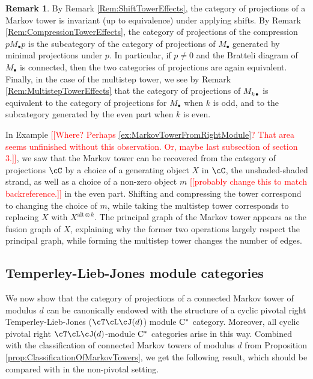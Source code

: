 \documentclass[11pt]{article}
\theoremstyle{plain}
\theoremstyle{definition}
\newtheorem{rem}[thm]{Remark}
\newcommand{\Cstar}{\rm{C^*}}
\newcommand{\nn}[1]{\textcolor{red}{[[#1]]}}
\begin{document}
\begin{rem}
By Remark \ref{Rem:ShiftTowerEffects}, the category of projections of a Markov tower is invariant (up to equivalence) under applying shifts. By Remark \ref{Rem:CompressionTowerEffects}, the category of projections of the compression $pM_\bullet p$ is the subcategory of the category of projections of $M_\bullet$ generated by minimal projections under $p$. In particular, if $p\neq 0$ and the Bratteli diagram of $M_\bullet$ is connected, then the two categories of projections are again equivalent. Finally, in the case of the multistep tower, we see by Remark \ref{Rem:MultistepTowerEffects} that the category of projections of $M_{k\bullet}$ is equivalent to the category of projections for $M_\bullet$ when $k$ is odd, and to the subcategory generated by the even part when $k$ is even.

In Example \nn{Where? Perhaps \ref{ex:MarkovTowerFromRightModule}? That area seems unfinished without this observation. Or, maybe last subsection of section 3.}, we saw that the Markov tower can be recovered from the category of projections $\cC$ by a choice of a generating object $X$ in $\cC$, the unshaded-shaded strand, as well as a choice of a non-zero object $m$ \nn{probably change this to match backreference.} in the even part. Shifting and compressing the tower correspond to changing the choice of $m$, while taking the multistep tower corresponds to replacing $X$ with $X^{\text{alt}\otimes{k}}$. The principal graph of the Markov tower appears as the fusion graph of $X$, explaining why the former two operations largely respect the principal graph, while forming the multistep tower changes the number of edges.
\end{rem}

\subsection{Temperley-Lieb-Jones module categories} 
\label{sec:TLJmodules}

We now show that the category of projections of a connected Markov tower of modulus $d$ can be canonically endowed with the structure of a cyclic pivotal right Temperley-Lieb-Jones ($\cT\cL\cJ(d)$) module $\Cstar$ category.
Moreover, all cyclic pivotal right $\cT\cL\cJ(d)$-module $\Cstar$ categories arise in this way.
Combined with the classification of connected Markov towers of modulus $d$ from Proposition \ref{prop:ClassificationOfMarkovTowers}, we get the following result, which should be compared with \cite{MR3420332} in the non-pivotal setting.
\end{document}
